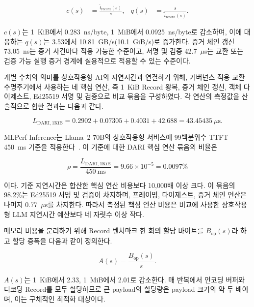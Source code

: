 \documentclass[10pt]{article}
\begin{document}
\begin{align}
c(s) &= \frac{\widetilde{t}_{\mathrm{record}}(s)}{s},
  & q(s) &= \frac{s}{\widetilde{t}_{\mathrm{record}}(s)}.
\label{eq:normalized}
\end{align}

$c(s)$는 1~KiB에서 0.283~ns/byte, 1~MiB에서 0.0925~ns/byte로 감소하며, 이에 대응하는 $q(s)$는 3.53에서 10.81~GB/s(10.1~GiB/s)로 증가한다. 증거 체인 갱신 73.05~ns는 증거 사건마다 적용 가능한 수준이고, 서명 및 검증 42.7~$\mu$s는 교환 또는 검증 가능 실행 증거 경계에 실용적으로 적용할 수 있는 수준이다.

개별 수치의 의미를 상호작용형 AI의 지연시간과 연결하기 위해, 거버넌스 적용 교환 수명주기에서 사용하는 네 핵심 연산, 즉 1~KiB Record 왕복, 증거 체인 갱신, 객체 다이제스트, Ed25519 서명 및 검증으로 비교 묶음을 구성하였다. 각 연산의 측정값을 산술적으로 합한 결과는 다음과 같다.

\begin{equation}
L_{\mathrm{DARI},1\mathrm{KiB}}
= 0.2902 + 0.07305 + 0.4031 + 42.688
= 43.45435~\mu\mathrm{s}.
\label{eq:interactive-budget}
\end{equation}

MLPerf Inference는 Llama~2 70B의 상호작용형 서비스에 99백분위수 TTFT 450~ms 기준을 적용한다~\cite{mlperf2025llm}. 이 기준에 대한 DARI 핵심 연산 묶음의 비율은

\begin{equation}
\rho = \frac{L_{\mathrm{DARI},1\mathrm{KiB}}}{450~\mathrm{ms}}
= 9.66 \times 10^{-5} = 0.0097\%
\label{eq:budget-ratio}
\end{equation}

이다. 기준 지연시간은 합산한 핵심 연산 비용보다 10,000배 이상 크다. 이 묶음의 98.2\%는 Ed25519 서명 및 검증이 차지하며, 프레이밍, 다이제스트, 증거 체인 연산은 나머지 0.77~$\mu$s를 차지한다. 따라서 측정된 핵심 연산 비용은 비교에 사용한 상호작용형 LLM 지연시간 예산보다 네 자릿수 이상 작다.

메모리 비용을 분리하기 위해 Record 벤치마크 한 회의 할당 바이트를 $B_{\mathrm{op}}(s)$라 하고 할당 증폭을 다음과 같이 정의한다.

\begin{equation}
A(s) = \frac{B_{\mathrm{op}}(s)}{s}.
\label{eq:allocation}
\end{equation}

$A(s)$는 1~KiB에서 2.33, 1~MiB에서 2.01로 감소한다. 매 반복에서 인코딩 버퍼와 디코딩 Record를 모두 할당하므로 큰 payload의 할당량은 payload 크기의 약 두 배이며, 이는 구체적인 최적화 대상이다.
\end{document}
